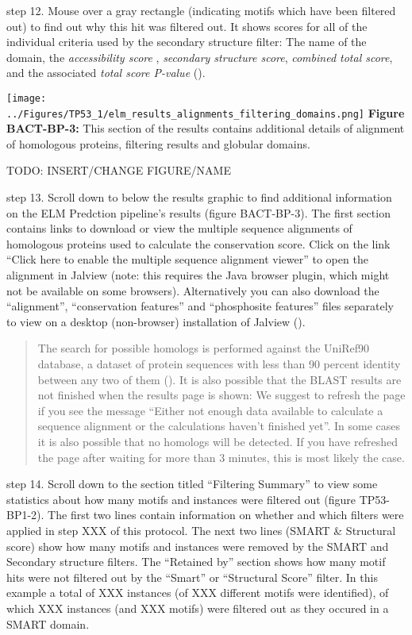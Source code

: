 step 12. Mouse over a gray rectangle (indicating motifs which have been
filtered out) to find out why this hit was filtered out. It shows scores
for all of the individual criteria used by the secondary structure
filter: The name of the domain, the \emph{accessibility score} ,
\emph{secondary structure score}, \emph{combined total score}, and the
associated \emph{total score P-value} (\cite{19852836}).

\texttt{[image: ../Figures/TP53\_1/elm\_results\_alignments\_filtering\_domains.png]}
\textbf{Figure BACT-BP-3:} This section of the results contains
additional details of alignment of homologous proteins, filtering
results and globular domains.

TODO: INSERT/CHANGE FIGURE/NAME

step 13. Scroll down to below the results graphic to find additional
information on the ELM Predction pipeline's results (figure BACT-BP-3).
The first section contains links to download or view the multiple
sequence alignments of homologous proteins used to calculate the
conservation score. Click on the link ``Click here to enable the
multiple sequence alignment viewer'' to open the alignment in Jalview
(note: this requires the Java browser plugin, which might not be
available on some browsers). Alternatively you can also download the
``alignment'', ``conservation features'' and ``phosphosite features''
files separately to view on a desktop (non-browser) installation of
Jalview (\cite{19151095}).

\begin{quote}
The search for possible homologs is performed against the UniRef90
database, a dataset of protein sequences with less than 90 percent
identity between any two of them (\cite{17379688}). It is also possible
that the BLAST results are not finished when the results page is shown:
We suggest to refresh the page if you see the message ``Either not
enough data available to calculate a sequence alignment or the
calculations haven't finished yet''. In some cases it is also possible
that no homologs will be detected. If you have refreshed the page after
waiting for more than 3 minutes, this is most likely the case.
\end{quote}

step 14. Scroll down to the section titled ``Filtering Summary'' to view
some statistics about how many motifs and instances were filtered out
(figure TP53-BP1-2). The first two lines contain information on whether
and which filters were applied in step XXX of this protocol. The next
two lines (SMART \& Structural score) show how many motifs and instances
were removed by the SMART and Secondary structure filters. The
``Retained by'' section shows how many motif hits were not filtered out
by the ``Smart'' or ``Structural Score'' filter. In this example a total
of XXX instances (of XXX different motifs were identified), of which XXX
instances (and XXX motifs) were filtered out as they occured in a SMART
domain.

